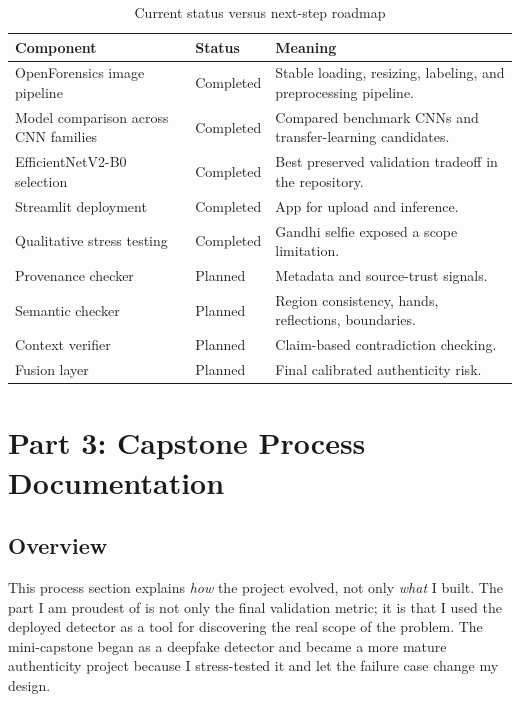 \documentclass[11pt]{article}
\begin{document}
\begin{table}[H]
\centering
\caption{Current status versus next-step roadmap}
\label{tab:status-roadmap}
\begin{tabular}{p{4.8cm}p{2.1cm}p{7.0cm}}
\toprule
Component & Status & Meaning \\
\midrule
OpenForensics image pipeline & Completed & Stable loading, resizing, labeling, and preprocessing pipeline. \\
Model comparison across CNN families & Completed & Compared benchmark CNNs and transfer-learning candidates. \\
EfficientNetV2-B0 selection & Completed & Best preserved validation tradeoff in the repository. \\
Streamlit deployment & Completed & App for upload and inference. \\
Qualitative stress testing & Completed & Gandhi selfie exposed a scope limitation. \\
Provenance checker & Planned & Metadata and source-trust signals. \\
Semantic checker & Planned & Region consistency, hands, reflections, boundaries. \\
Context verifier & Planned & Claim-based contradiction checking. \\
Fusion layer & Planned & Final calibrated authenticity risk. \\
\bottomrule
\end{tabular}
\end{table}

\section{Part 3: Capstone Process Documentation}

\subsection{Overview}
This process section explains \emph{how} the project evolved, not only \emph{what} I built. The part I am proudest of is not only the final validation metric; it is that I used the deployed detector as a tool for discovering the real scope of the problem. The mini-capstone began as a deepfake detector and became a more mature authenticity project because I stress-tested it and let the failure case change my design.
\end{document}
